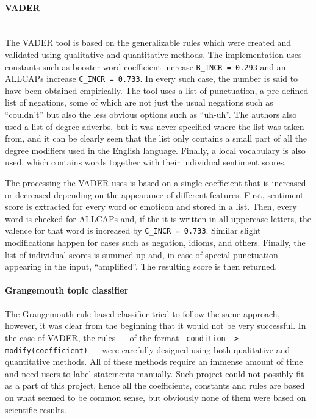 \paragraph{VADER}\mbox{}\\
The VADER tool is based on the generalizable rules which were created and validated using qualitative
and quantitative methods. The implementation uses constants such as booster word coefficient increase \texttt{B\_INCR = 0.293} and an ALLCAPs increase \texttt{C\_INCR = 0.733}. In every such case, the number is said to have been obtained empirically. The tool uses a list of punctuation, a pre-defined list of negations, some of which are not just the usual negations such as ``couldn't'' but also the less obvious options such as ``uh-uh''. The authors also used a list of degree adverbs, but it was never specified where the list was taken from, and it can be clearly seen that the list only contains a small part of all the degree modifiers used in the English language. Finally, a local vocabulary is also used, which contains words together with their individual sentiment scores.

The processing the VADER uses is based on a single coefficient that is increased or decreased depending on the appearance of different features. First, sentiment score is extracted for every word or emoticon and stored in a list. Then, every word is checked for ALLCAPs and, if the it is written in all uppercase letters, the valence for that word is increased by \texttt{C\_INCR = 0.733}. Similar slight modifications happen for cases such as negation, idioms, and others. Finally, the list of individual scores is summed up and, in case of special punctuation appearing in the input, ``amplified''. The resulting score is then returned.

\paragraph{Grangemouth topic classifier}
The Grangemouth rule-based classifier tried to follow the same approach, however, it was clear from the beginning that it would not be very successful. In the case of VADER, the rules --- of the format \texttt{ condition -> modify(coefficient)} --- were carefully designed using both qualitative and quantitative methods. All of these methods require an immense amount of time and need users to label statements manually. Such project could not possibly fit as a part of this project, hence all the coefficients, constants and rules are based on what seemed to be common sense, but obviously none of them were based on scientific results. 

